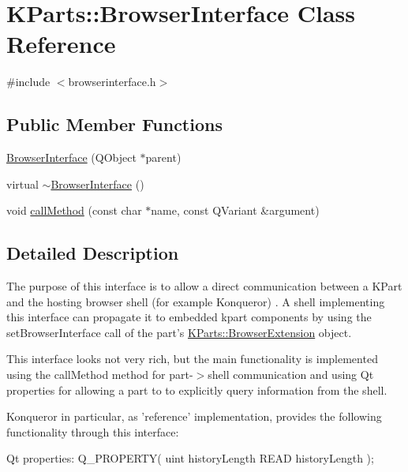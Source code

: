 \hypertarget{classKParts_1_1BrowserInterface}{\section{\-K\-Parts\-:\-:\-Browser\-Interface \-Class \-Reference}
\label{classKParts_1_1BrowserInterface}
}


{\ttfamily \#include $<$browserinterface.\-h$>$}

\subsection*{\-Public \-Member \-Functions}
\begin{DoxyCompactItemize}
\item 
\hyperlink{classKParts_1_1BrowserInterface_a7e7c8ab24a9b90800846028e66eabaed}{\-Browser\-Interface} (\-Q\-Object $\ast$parent)
\item 
virtual \hyperlink{classKParts_1_1BrowserInterface_af6f3ca797d626ffd8676a5babb09ad22}{$\sim$\-Browser\-Interface} ()
\item 
void \hyperlink{classKParts_1_1BrowserInterface_a3b2d9e1791a4a6195b53b48180ec761c}{call\-Method} (const char $\ast$name, const \-Q\-Variant \&argument)
\end{DoxyCompactItemize}


\subsection{\-Detailed \-Description}
\-The purpose of this interface is to allow a direct communication between a \-K\-Part and the hosting browser shell (for example \-Konqueror) . \-A shell implementing this interface can propagate it to embedded kpart components by using the set\-Browser\-Interface call of the part's \hyperlink{classKParts_1_1BrowserExtension}{\-K\-Parts\-::\-Browser\-Extension} object.

\-This interface looks not very rich, but the main functionality is implemented using the call\-Method method for part-\/$>$shell communication and using \-Qt properties for allowing a part to to explicitly query information from the shell.

\-Konqueror in particular, as 'reference' implementation, provides the following functionality through this interface\-:

\-Qt properties\-: \-Q\-\_\-\-P\-R\-O\-P\-E\-R\-T\-Y( uint history\-Length R\-E\-A\-D history\-Length );

